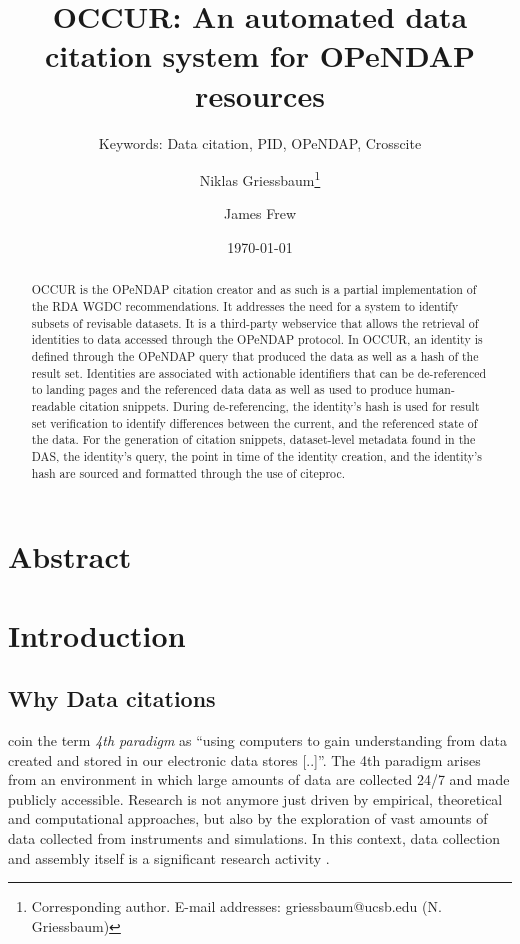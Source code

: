 \documentclass[letterpaper, twocolumn, parskip=half, fontsize=8pt, DIV=calc]{scrartcl}
\title{OCCUR: An automated data citation system for OPeNDAP resources}
\author{Niklas Griessbaum\thanks{Corresponding author. E-mail addresses: griessbaum@ucsb.edu (N. Griessbaum)} }
\author{James Frew}
\affil{Bren School of Environmental Science and Management, University of California, Santa Barbara, United States}
\subtitle{Keywords: Data citation, PID, OPeNDAP, Crosscite}
\date{\today}
\begin{document}
\maketitle
\tableofcontents

\newpage

\glsunsetall
\section*{Abstract}
\begin{abstract} 
    \gls{OCCUR} is the \gls{OPeNDAP} citation creator and as such is a partial implementation of the RDA WGDC recommendations. It addresses the need for a system to identify subsets of revisable datasets.
    It is a third-party webservice that allows the retrieval of identities to data accessed through the OPeNDAP protocol. In OCCUR, an identity is defined through the OPeNDAP query that produced the data as well as a hash of the result set. 
    Identities are associated with actionable identifiers that can be de-referenced to landing pages and the referenced data data as well as used to produce human-readable citation snippets. 
    During de-referencing, the identity's hash is used for result set verification to identify differences between the current, and the referenced state of the data.
    For the generation of citation snippets, dataset-level metadata found in the \gls{DAS}, the identity's query, the point in time of the identity creation, and the identity's hash are sourced and formatted through the use of citeproc.
\end{abstract}
\glsresetall



\section{Introduction}

\subsection{Why Data citations}

\cite{Hey2009} coin the term \textit{4th paradigm} as ``using computers to gain understanding from data created and stored in our electronic data stores [..]''.
The 4th paradigm arises from an environment in which large amounts of data are collected 24/7 and made publicly accessible. Research is not anymore just driven by empirical, theoretical and computational approaches, but also by the exploration of vast amounts of data collected from instruments and simulations. In this context, data collection and assembly itself is a significant research activity \citep{Frew2012}.
\end{document}
